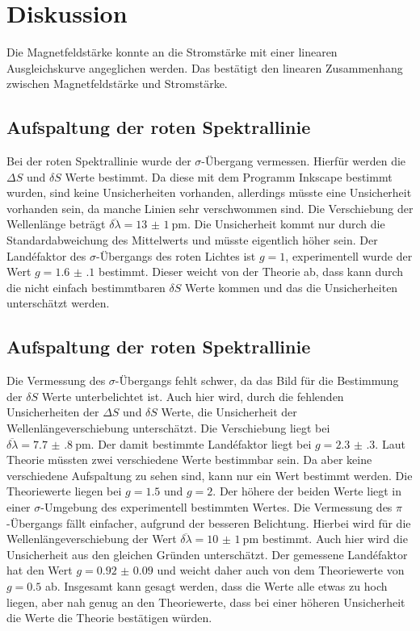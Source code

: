 \section{Diskussion}
Die Magnetfeldstärke konnte an die Stromstärke mit einer linearen Ausgleichskurve angeglichen werden. 
Das bestätigt den linearen Zusammenhang zwischen Magnetfeldstärke und Stromstärke.
\subsection{Aufspaltung der roten Spektrallinie}
Bei der roten Spektrallinie wurde der $\sigma$-Übergang vermessen. Hierfür werden die $\Delta S$ und $\delta S$ 
Werte bestimmt. Da diese mit dem Programm Inkscape \cite{Inkscape} bestimmt wurden, sind keine Unsicherheiten vorhanden, allerdings 
müsste eine Unsicherheit vorhanden sein, da manche Linien sehr verschwommen sind. Die Verschiebung der Wellenlänge 
beträgt $\overline{\delta\lambda} = \SI{13(1)}{\pico\meter}$. Die Unsicherheit kommt nur durch die Standardabweichung des 
Mittelwerts und müsste eigentlich höher sein.
Der Landéfaktor des $\sigma$-Übergangs des roten Lichtes ist $g=1$, experimentell wurde der Wert $g=\num{1.6(1)}$ 
bestimmt. Dieser weicht von der Theorie ab, dass kann durch die nicht einfach bestimmtbaren $\delta S$ Werte kommen und 
das die Unsicherheiten unterschätzt werden.
\subsection{Aufspaltung der roten Spektrallinie}
Die Vermessung des $\sigma$-Übergangs fehlt schwer, da das Bild für die Bestimmung der $\delta S$ Werte unterbelichtet ist.
Auch hier wird, durch die fehlenden Unsicherheiten der $\Delta S$ und $\delta S$ Werte, die Unsicherheit der 
Wellenlängeverschiebung unterschätzt. Die Verschiebung liegt bei $\overline{\delta\lambda} = \SI{7.7(8)}{\pico\meter}$.
Der damit bestimmte Landéfaktor liegt bei $g=\num{2.3(3)}$. Laut Theorie müssten zwei verschiedene Werte bestimmbar sein.
Da aber keine verschiedene Aufspaltung zu sehen sind, kann nur ein Wert bestimmt werden. Die Theoriewerte liegen bei 
$g=\num{1.5}$ und $g=2$. Der höhere der beiden Werte liegt in einer $\sigma$-Umgebung des experimentell bestimmten Wertes.
Die Vermessung des $\pi$-Übergangs fällt einfacher, aufgrund der besseren Belichtung.
Hierbei wird für die Wellenlängeverschiebung der Wert $\overline{\delta\lambda} = \SI{10(1)}{\pico\meter}$ bestimmt. 
Auch hier wird die Unsicherheit aus den gleichen Gründen unterschätzt.
Der gemessene Landéfaktor hat den Wert $g=\num{0.92(9)}$ und weicht daher auch von dem Theoriewerte von $g=\num{0.5}$ ab.
Insgesamt kann gesagt werden, dass die Werte alle etwas zu hoch liegen, aber nah genug an den Theoriewerte, dass bei einer 
höheren Unsicherheit die Werte die Theorie bestätigen würden. 